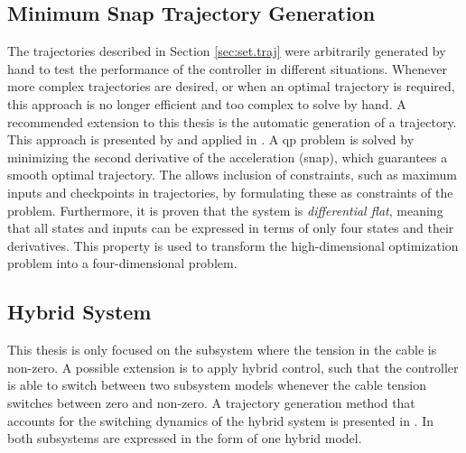 
\subsection{Minimum Snap Trajectory Generation}
The trajectories described in Section \ref{sec:set.traj} were arbitrarily generated by hand to test the performance of the controller in different situations. 
Whenever more complex trajectories are desired, or when an optimal trajectory is required, this approach is no longer efficient and too complex to solve by hand.
A recommended extension to this thesis is the automatic generation of a trajectory. 
This approach is presented by \cite{Mellinger2011} and applied in \cite{Tang2014,Tang2015}. A \acs{qp} problem is solved by minimizing the second derivative of the acceleration (snap), which guarantees a smooth optimal trajectory. The  allows inclusion of constraints, such as maximum inputs and checkpoints in trajectories, by formulating these as constraints of the  problem. Furthermore, it is proven that the system is \textit{differential flat}, meaning that all states and inputs can be expressed in terms of only four states and their derivatives. This property is used to transform the high-dimensional optimization problem into a four-dimensional problem.

\subsection{Hybrid System}
This thesis is only focused on the subsystem where the tension in the cable is non-zero. A possible extension is to apply hybrid control, such that the controller is able to switch between two subsystem models whenever the cable tension switches between zero and non-zero. A trajectory generation method that accounts for the switching dynamics of the hybrid system is presented in \cite{Tang2014}. In \cite{Sreenath2013c,Tang2014,Tang2015} both subsystems are expressed in the form of one hybrid model. 